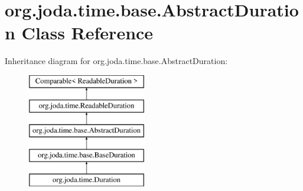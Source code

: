 \hypertarget{classorg_1_1joda_1_1time_1_1base_1_1_abstract_duration}{\section{org.\-joda.\-time.\-base.\-Abstract\-Duration Class Reference}
\label{classorg_1_1joda_1_1time_1_1base_1_1_abstract_duration}
}
Inheritance diagram for org.\-joda.\-time.\-base.\-Abstract\-Duration\-:\begin{figure}[H]
\begin{center}
\leavevmode
\includegraphics[height=5.000000cm]{classorg_1_1joda_1_1time_1_1base_1_1_abstract_duration}
\end{center}
\end{figure}
